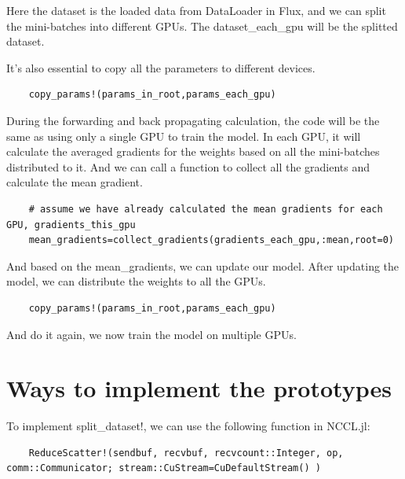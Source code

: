\documentclass[12pt]{extarticle}
\begin{document}
Here the dataset is the loaded data from DataLoader in Flux, and we can split the mini-batches into different GPUs. The dataset\_each\_gpu will be the splitted dataset. 

It's also essential to copy all the parameters to different devices. 
\begin{verbatim}
    copy_params!(params_in_root,params_each_gpu)
\end{verbatim}

During the forwarding and back propagating calculation, the code will be the same as using only a single GPU to train the model. In each GPU, 
it will calculate the averaged gradients for the weights based on all the mini-batches distributed to it. And we can call a function
to collect all the gradients and calculate the mean gradient.
\begin{verbatim}
    # assume we have already calculated the mean gradients for each GPU, gradients_this_gpu
    mean_gradients=collect_gradients(gradients_each_gpu,:mean,root=0)
\end{verbatim}

And based on the mean\_gradients, we can update our model. After updating the model, we can distribute the weights to all the GPUs.
\begin{verbatim}
    copy_params!(params_in_root,params_each_gpu)
\end{verbatim}

And do it again, we now train the model on multiple GPUs.

\section{Ways to implement the prototypes}

To implement split\_dataset!, we can use the following function in NCCL.jl:
\begin{verbatim}
    ReduceScatter!(sendbuf, recvbuf, recvcount::Integer, op, comm::Communicator; stream::CuStream=CuDefaultStream() )
\end{verbatim}
\end{document}
